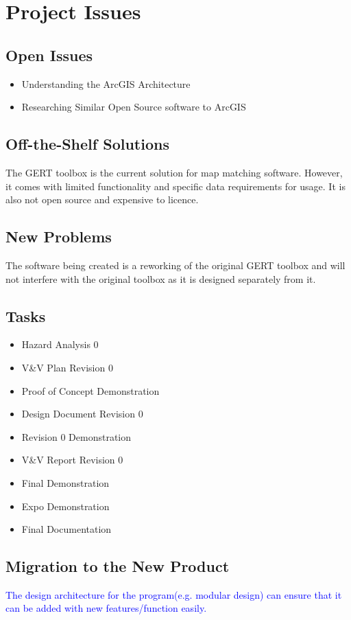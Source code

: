 \documentclass[12pt, titlepage]{article}
\begin{document}
\section{Project Issues}

\subsection{Open Issues}
\begin{itemize}
    \item Understanding the ArcGIS Architecture 
    \item Researching Similar Open Source software to ArcGIS
\end{itemize}

\subsection{Off-the-Shelf Solutions}
The GERT toolbox is the current solution for map matching software. However, it comes with limited functionality and specific data requirements for usage. It is also not open source and expensive to licence. 
\subsection{New Problems}
The software being created is a reworking of the original GERT toolbox and will not interfere with the original toolbox as it is designed separately from it.
\subsection{Tasks}
\begin{itemize}
    \item Hazard Analysis 0
    \item V&V Plan Revision 0
    \item Proof of Concept Demonstration
    \item Design Document Revision 0
    \item Revision 0 Demonstration
    \item V&V Report Revision 0
    \item Final Demonstration
    \item Expo Demonstration
    \item Final Documentation
\end{itemize}
\subsection{Migration to the New Product}
\textcolor{blue}{The design architecture for the program(e.g. modular design) can ensure that it can be added with new features/function easily.}
\end{document}
